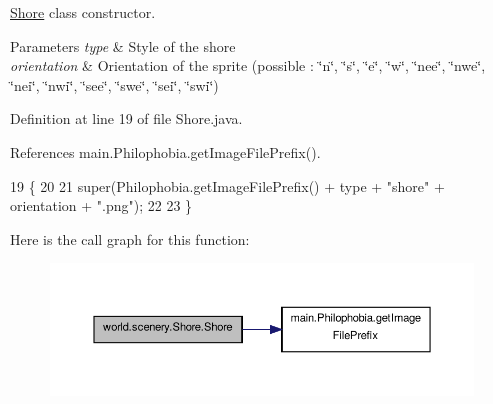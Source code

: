 \hyperlink{classworld_1_1scenery_1_1_shore}{Shore} class constructor. 


\begin{DoxyParams}{Parameters}
{\em type} & Style of the shore \\
\hline
{\em orientation} & Orientation of the sprite (possible \-: \char`\"{}n\char`\"{}, \char`\"{}s\char`\"{}, \char`\"{}e\char`\"{}, \char`\"{}w\char`\"{}, \char`\"{}nee\char`\"{}, \char`\"{}nwe\char`\"{}, \char`\"{}nei\char`\"{}, \char`\"{}nwi\char`\"{}, \char`\"{}see\char`\"{}, \char`\"{}swe\char`\"{}, \char`\"{}sei\char`\"{}, \char`\"{}swi\char`\"{}) \\
\hline
\end{DoxyParams}


Definition at line 19 of file Shore.\-java.



References main.\-Philophobia.\-get\-Image\-File\-Prefix().


\begin{DoxyCode}
19                                                               \{
20 
21         super(Philophobia.getImageFilePrefix() + type + \textcolor{stringliteral}{"shore"} + orientation + \textcolor{stringliteral}{".png"});
22 
23     \}
\end{DoxyCode}


Here is the call graph for this function\-:
\nopagebreak
\begin{figure}[H]
\begin{center}
\leavevmode
\includegraphics[width=350pt]{classworld_1_1scenery_1_1_shore_a91873a583f2f5801995937359f8174c2_cgraph}
\end{center}
\end{figure}




